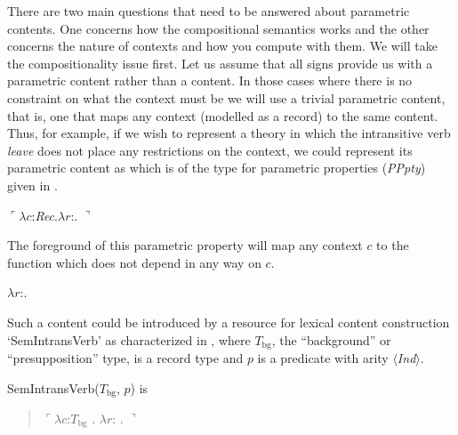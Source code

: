 There are two main questions that need to be answered about parametric
contents.  One concerns how the compositional semantics works and the
other concerns the nature of contexts and how you compute with them.
We will take the compositionality issue first.  Let us assume that all
signs provide us with a parametric content rather than a content.  In
those cases where there is no constraint on what the context must be
we will use a trivial parametric content, that is, one that maps any
context (modelled as a record) to the same content.  Thus, for
example, if we wish to represent a theory in which the intransitive
verb \textit{leave} does not place any restrictions on the context, we
could represent its parametric content as  which is of the
type for parametric properties (\textit{PPpty}) given in .
\begin{ex}
\begin{subex}
\item $\ulcorner\lambda c$:\textit{Rec}.$\lambda r$:.
$\urcorner$

\item {}
\end{subex}
\label{ex:parametricLeave}

\end{ex}
The foreground of this parametric property will map any context $c$ to the function \nexteg{} which does not depend in
any way on $c$.
\begin{ex} 
$\lambda r$:.
\end{ex} 
  
Such a content could be introduced by a resource for
lexical content construction `SemIntransVerb' as characterized in
\nexteg{}, where $T_{\mathrm{bg}}$, the
``background'' or ``presupposition'' type, is a record type and $p$ is a predicate with arity $\langle$\textit{Ind}$\rangle$.
\begin{ex} 
  SemIntransVerb($T_{\mathrm{bg}}$, $p$) is
  \begin{quote}
$\ulcorner\lambda c$:$T_{\mathrm{bg}}$ . $\lambda
r$:
. $\urcorner$
\end{quote}

\end{ex}


